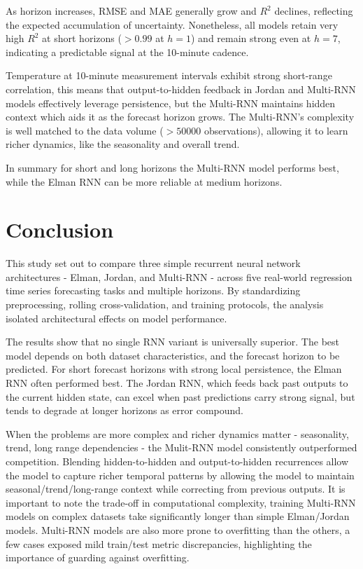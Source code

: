 \documentclass[conference]{IEEEtran}
\begin{document}
As horizon increases, RMSE and MAE generally grow and $R^2$ declines, reflecting the expected accumulation of uncertainty. Nonetheless, all models retain very high $R^2$ at short horizons ($>0.99$ at $h{=}1$) and remain strong even at $h{=}7$, indicating a predictable signal at the 10-minute cadence.

Temperature at 10-minute measurement intervals exhibit strong short-range correlation, this means that output-to-hidden feedback in Jordan and Multi-RNN models effectively leverage persistence, but the Multi-RNN maintains hidden context which aids it as the forecast horizon grows. The Multi-RNN's complexity is well matched to the data volume ($> 50000$ observations), allowing it to learn richer dynamics, like the seasonality and overall trend.

In summary for short and long horizons the Multi-RNN model performs best, while the Elman RNN can be more reliable at medium horizons.

\section{\textbf{Conclusion}}

This study set out to compare three simple recurrent neural network architectures - Elman, Jordan, and Multi-RNN - across five real-world regression time series forecasting tasks and multiple horizons. By standardizing preprocessing, rolling cross-validation, and training protocols, the analysis isolated architectural effects on model performance.

The results show that no single RNN variant is universally superior. The best model depends on both dataset characteristics, and the forecast horizon to be predicted. For short forecast horizons with strong local persistence, the Elman RNN often performed best. The Jordan RNN, which feeds back past outputs to the current hidden state, can excel when past predictions carry strong signal, but tends to degrade at longer horizons as error compound.

When the problems are more complex and richer dynamics matter - seasonality, trend, long range dependencies - the Mulit-RNN model consistently outperformed competition. Blending hidden-to-hidden and output-to-hidden recurrences allow the model to capture richer temporal patterns by allowing the model to maintain seasonal/trend/long-range context while correcting from previous outputs. It is important to note the trade-off in computational complexity, training Multi-RNN models on complex datasets take significantly longer than simple Elman/Jordan models. Multi-RNN models are also more prone to overfitting than the others, a few cases exposed mild train/test metric discrepancies, highlighting the importance of guarding against overfitting.
\end{document}
